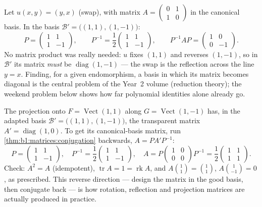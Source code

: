 \begin{example}
\label{ex:b1:matrices:conjugationrun}
Let $u(x, y) = (y, x)$ (swap), with matrix $A = \begin{pmatrix} 0
& 1\\ 1 & 0\end{pmatrix}$ in the canonical basis. In the basis
$\mathcal B' = \bigl((1,1), (1,-1)\bigr)$:
\[
P = \begin{pmatrix} 1 & 1\\ 1 & -1 \end{pmatrix},
\qquad
P^{-1} = \frac12\begin{pmatrix} 1 & 1\\ 1 & -1 \end{pmatrix},
\qquad
P^{-1} A P = \begin{pmatrix} 1 & 0\\ 0 & -1 \end{pmatrix}.
\]
No matrix product was really needed: $u$ fixes $(1,1)$ and
reverses $(1,-1)$, so in $\mathcal B'$ its matrix \emph{must} be
$\operatorname{diag}(1, -1)$ --- the swap is the reflection
across the line $y = x$. Finding, for a given endomorphism, a
basis in which its matrix becomes diagonal is the central problem
of the Year~2 volume (reduction theory); the weekend problem
below shows how far polynomial identities alone already go.
\end{example}

\begin{example}
\label{ex:b1:matrices:reverserun}
The projection onto $F = \operatorname{Vect}(1,1)$ along $G =
\operatorname{Vect}(1,-1)$ has, in the adapted basis $\mathcal
B' = \bigl((1,1),(1,-1)\bigr)$, the transparent matrix $A' =
\operatorname{diag}(1, 0)$. To get its canonical-basis matrix,
run \cref{thm:b1:matrices:conjugation} backwards, $A = P A'
P^{-1}$:
\[
P = \begin{pmatrix} 1 & 1\\ 1 & -1\end{pmatrix},
\quad
P^{-1} = \frac12\begin{pmatrix} 1 & 1\\ 1 & -1\end{pmatrix},
\quad
A = P\begin{pmatrix} 1 & 0\\ 0 & 0\end{pmatrix}P^{-1}
= \frac12\begin{pmatrix} 1 & 1\\ 1 & 1\end{pmatrix}.
\]
Check: $A^2 = A$ (idempotent), $\operatorname{tr} A = 1 =
\operatorname{rk} A$, and $A\binom{1}{1} = \binom11$,
$A\binom{1}{-1} = 0$, as prescribed. This reverse direction ---
design the matrix in the good basis, then conjugate back --- is
how rotation, reflection and projection matrices are actually
produced in practice.
\end{example}

